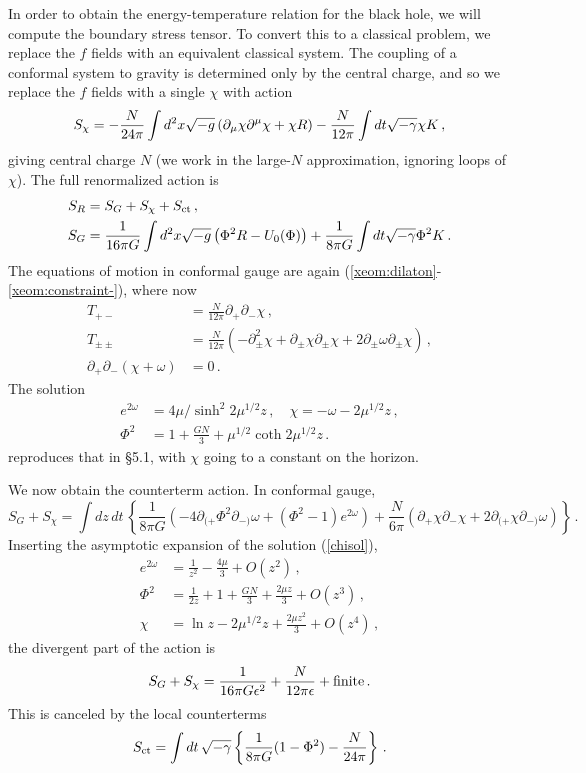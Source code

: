 \documentclass[12pt]{article}
\newcommand{\be}{\begin{equation}}
\newcommand{\ee}{\end{equation}}
\begin{document}
{In order to obtain the energy-temperature relation for the black hole, we will compute the boundary stress tensor.  To convert this to a classical problem, we replace the $f$ fields with an equivalent classical system.  The coupling of a conformal system to gravity is determined only by the central charge, and so we replace the $f$ fields with a single $\chi$ with action
\begin{align}
S_\chi =  -{N \over 24 \pi} \int d^2x \sqrt{-g} \left(  \partial_\mu \chi \partial^\mu \chi +  \chi R\right)
- {N \over12 \pi} \int dt \sqrt{-\gamma} \chi K\,, \label{Qcorr}
\end{align}
giving central charge $N$ (we work in the large-$N$ approximation, ignoring loops of $\chi$).  The full renormalized action is
\begin{align}
S_R &= S_G + S_\chi + S_{\rm ct} \,,\nonumber\\
S_G &= {1 \over 16 \pi G} \int d^2x \sqrt{-g}\left( \Phi^2 R -  U_{0}(\Phi) \right)  + {1 \over 8 \pi G} \int dt \sqrt{-\gamma} \Phi^2  K \,.
\end{align}
The equations of motion in conformal gauge are again (\ref{xeom:dilaton}-\ref{xeom:constraint-}), where now
\begin{align}
T_{+-} &= \frac{N}{12\pi} \partial_+ \partial_- \chi  \,, \nonumber\\
T_{\pm\pm} &= \frac{N}{12\pi} \left( - \partial_\pm^2 \chi + \partial_\pm \chi \partial_\pm\chi + 2 \partial_\pm \omega \partial_\pm \chi \right)   \,,\nonumber\\
\partial_+ \partial_- (\chi + \omega) &= 0 \,.
\end{align}
The solution
\begin{align}
e^{2\omega} &= {4\mu}/{\sinh^2 2\mu^{1/2}z}\,, \quad \chi = -\omega -2\mu^{1/2} z \,, \nonumber\\
\Phi^2 &= 1 + \frac{GN}{3} +  \mu^{1/2}  \coth 2\mu^{1/2}z \,. \label{chisol}
\end{align}
reproduces that in \S5.1, with $\chi$ going to a constant on the horizon.

We now obtain the counterterm action.  In conformal gauge,
\be
S_G + S_\chi = \int dz\,dt\, \left\{ \frac{1}{8\pi G}\left( -4 \partial_{(+}\Phi^2 \partial_{-)}\omega + (\Phi^2 - 1) e^{2\omega} \right)
+ \frac{N}{6\pi} \left( \partial_+ \chi \partial_- \chi + 2 \partial_{(+}\chi \partial_{-)}\omega \right) \right\}\,.
\ee
Inserting the asymptotic expansion of the solution (\ref{chisol}),
\begin{align}
e^{2\omega} &= \frac{1}{z^2} - \frac{4\mu}{3} + O(z^2) \,, \nonumber\\
\Phi^2 &= \frac{1}{2z} + 1 + \frac{GN}{3} + \frac{2\mu z}{3} + O(z^3) \,, \nonumber\\
\chi &= \ln z - 2\mu^{1/2} z + \frac{2\mu z^2}{3} + O(z^4) \,,  \label{asymp}
\end{align}
the divergent part of the action is 
\be
S_G + S_\chi = \frac{1}{16\pi G \epsilon^2} + \frac{N}{12\pi \epsilon} + {\rm finite} \,.
\ee
This is canceled by the local counterterms
\be
S_{\rm ct} = \int dt\,  \sqrt{-\gamma}\left\{\frac{1}{8\pi G} (1 - \Phi^2) - \frac{N}{24\pi} \right\}\,.
\ee

}
\end{document}
